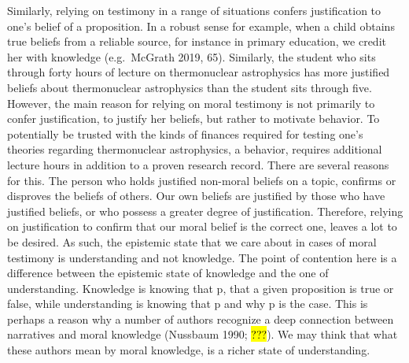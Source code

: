 \documentclass[
  letterpaper,
  DIV=11,
  numbers=noendperiod]{scrartcl}
\theoremstyle{remark}
\begin{document}
Similarly, relying on testimony in a range of situations confers
justification to one's belief of a proposition. In a robust sense for
example, when a child obtains true beliefs from a reliable source, for
instance in primary education, we credit her with knowledge
(e.g.~McGrath 2019, 65). Similarly, the student who sits through forty
hours of lecture on thermonuclear astrophysics has more justified
beliefs about thermonuclear astrophysics than the student sits through
five. However, the main reason for relying on moral testimony is not
primarily to confer justification, to justify her beliefs, but rather to
motivate behavior. To potentially be trusted with the kinds of finances
required for testing one's theories regarding thermonuclear
astrophysics, a behavior, requires additional lecture hours in addition
to a proven research record. There are several reasons for this. The
person who holds justified non-moral beliefs on a topic, confirms or
disproves the beliefs of others. Our own beliefs are justified by those
who have justified beliefs, or who possess a greater degree of
justification. Therefore, relying on justification to confirm that our
moral belief is the correct one, leaves a lot to be desired. As such,
the epistemic state that we care about in cases of moral testimony is
understanding and not knowledge. The point of contention here is a
difference between the epistemic state of knowledge and the one of
understanding. Knowledge is knowing that p, that a given proposition is
true or false, while understanding is knowing that p and why p is the
case. This is perhaps a reason why a number of authors recognize a deep
connection between narratives and moral knowledge (Nussbaum 1990;
\hl{???}). We may think that what these authors mean by moral knowledge,
is a richer state of understanding.
\end{document}
